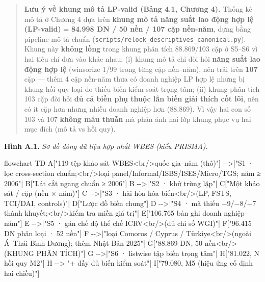 \documentclass[
  a4paper,
  13pt]{extreport}
\newenvironment{Shaded}{}{}
\newcommand{\NormalTok}[1]{#1}
\begin{document}
\begin{quote}
\textbf{Lưu ý về khung mô tả LP-valid (Bảng 4.1, Chương 4).} Thống kê mô
tả ở Chương 4 dựa trên \textbf{khung mô tả năng suất lao động hợp lệ
(LP-valid)} = \textbf{84.998 DN / 50 nền / 107 cặp nền-năm}, dựng bằng
pipeline mô tả chuẩn
(\texttt{scripts/relock\_descriptives\_canonical.py}). Khung này
\textbf{không lồng} trong khung phân tích 88.869/103 cặp ở S5--S6 vì hai
tiêu chí đưa vào khác nhau: (i) khung mô tả chỉ đòi hỏi \textbf{năng
suất lao động hợp lệ} (winsorize 1/99 trong từng cặp nền--năm), nên trải
trên \textbf{107} cặp --- thêm 4 cặp nền-năm thưa có doanh nghiệp LP hợp
lệ nhưng bị khung hồi quy loại do thiếu biến kiểm soát trọng tâm; (ii)
khung phân tích 103 cặp đòi hỏi \textbf{đủ cả biến phụ thuộc lẫn biến
giải thích cốt lõi}, nên có ít cặp hơn nhưng nhiều doanh nghiệp hơn
(88.869). Vì vậy hai con số 103 và 107 \textbf{không mâu thuẫn} mà phản
ánh hai lớp khung phục vụ hai mục đích (mô tả vs hồi quy).
\end{quote}

\textbf{Hình A.1.} \emph{Sơ đồ dòng dữ liệu hợp nhất WBES (kiểu
PRISMA).}

\begin{Shaded}
\begin{Highlighting}[]
\NormalTok{flowchart TD}
\NormalTok{    A["119 tệp khảo sát WBES\textless{}br/\textgreater{}quốc gia–năm (thô)"] {-}{-}\textgreater{}|"S1 · lọc cross{-}section chuẩn;\textless{}br/\textgreater{}loại panel/Informal/ISBS/ISES/Micro/TGS; năm ≥ 2006"| B["Lát cắt ngang chuẩn ≥ 2006"]}
\NormalTok{    B {-}{-}\textgreater{}|"S2 · khử trùng lặp"| C["Một khảo sát / cặp (nền × năm)"]}
\NormalTok{    C {-}{-}\textgreater{}|"S3 · hài hòa hóa biến\textless{}br/\textgreater{}(LP, FSTS, TCI/DAI, controls)"| D["Lược đồ biến chung"]}
\NormalTok{    D {-}{-}\textgreater{}|"S4 · mã thiếu −9/−8/−7 thành khuyết;\textless{}br/\textgreater{}kiểm tra miền giá trị"| E["106.765 bản ghi doanh nghiệp–năm"]}
\NormalTok{    E {-}{-}\textgreater{}|"S5 · gán chế độ thể chế ICRV\textless{}br/\textgreater{}(đủ chỉ số WGI)"| F["96.415 DN phân loại · 52 nền"]}
\NormalTok{    F {-}{-}\textgreater{}|"loại Comoros / Cyprus / Türkiye\textless{}br/\textgreater{}(ngoài Á–Thái Bình Dương); thêm Nhật Bản 2025"| G["88.869 DN, 50 nền\textless{}br/\textgreater{}(KHUNG PHÂN TÍCH)"]}
\NormalTok{    G {-}{-}\textgreater{}|"S6 · listwise tập biến trọng tâm"| H["81.022, N hồi quy M2"]}
\NormalTok{    H {-}{-}\textgreater{}|"+ đầy đủ biến kiểm soát"| I["79.080, M5 (hiệu ứng cố định hai chiều)"]}
\end{Highlighting}
\end{Shaded}
\end{document}
